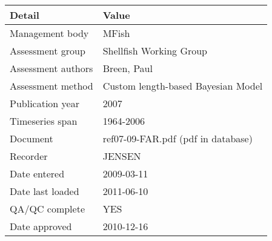 \begin{table}[htb]
\centering
\begin{tabular}{lp{7cm}}
\toprule
Detail & Value \\
\midrule
Management body    & MFish                              \\
Assessment group   & Shellfish Working Group            \\
Assessment authors & Breen, Paul                        \\
Assessment method  & Custom length-based Bayesian Model \\
Publication year   & 2007                               \\
Timeseries span    & 1964-2006                          \\
Document           & ref07-09-FAR.pdf (pdf in database) \\
Recorder           & JENSEN                             \\
Date entered       & 2009-03-11                         \\
Date last loaded   & 2011-06-10                         \\
QA/QC complete     & YES                                \\
Date approved      & 2010-12-16                         \\
\bottomrule
\end{tabular}
\label{tab:assessdet}
\end{table}

